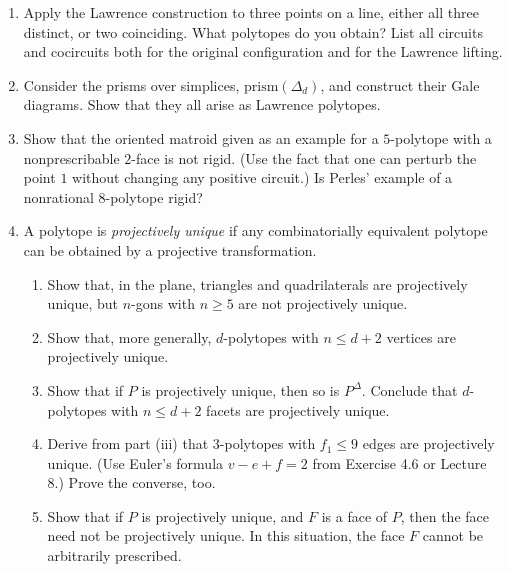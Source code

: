 \documentclass{article}
\begin{document}
\begin{enumerate}
Use central diagrams to classify the centrally symmetric polytopes with at most $2d+2$ vertices for small values of $d$. (The case $d=4$ was done by Gr\"unbaum [252, Sect.\ 6.4].)

Argue that a complete classification of centrally symmetric polytopes with at most $2d+2$ vertices is out of reach. 

Show that the metric properties of this diagram are important, and that no further reduction to affine diagrams is possible. 

Similarly, show that the signed circuits of $X_0$ do not determine those of $X$, so we cannot simply reduce to oriented matroid data [402].

\begin{proof}
    
\end{proof}

\item Apply the Lawrence construction to three points on a line, either all three distinct, or two coinciding. What polytopes do you obtain? List all circuits and cocircuits both for the original configuration and for the Lawrence lifting.

\item Consider the prisms over simplices, $\mathrm{prism}(\Delta_d)$, and construct their Gale diagrams. Show that they all arise as Lawrence polytopes.

\item Show that the oriented matroid given as an example for a $5$-polytope with a nonprescribable $2$-face is not rigid. (Use the fact that one can perturb the point $1$ without changing any positive circuit.) Is Perles' example of a nonrational $8$-polytope rigid?

\item A polytope is \emph{projectively unique} if any combinatorially equivalent polytope can be obtained by a projective transformation.
\begin{enumerate}[label=(\roman*)]
\item Show that, in the plane, triangles and quadrilaterals are projectively unique, but $n$-gons with $n\ge 5$ are not projectively unique.
\item Show that, more generally, $d$-polytopes with $n\le d+2$ vertices are projectively unique.
\item Show that if $P$ is projectively unique, then so is $P^\Delta$. Conclude that $d$-polytopes with $n\le d+2$ facets are projectively unique.
\item Derive from part (iii) that $3$-polytopes with $f_1\le 9$ edges are projectively unique. (Use Euler's formula $v-e+f=2$ from Exercise 4.6 or Lecture 8.) Prove the converse, too.
\item Show that if $P$ is projectively unique, and $F$ is a face of $P$, then the face need not be projectively unique. In this situation, the face $F$ cannot be arbitrarily prescribed.
\end{enumerate}


\end{enumerate}
\end{document}
